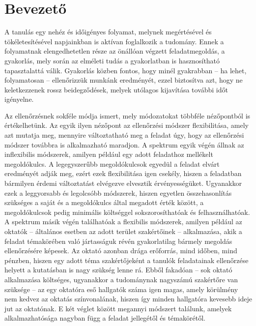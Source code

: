 \chapter*{Bevezető}

A tanulás egy nehéz és időigényes folyamat, melynek megértésével és tökéletesítésével napjainkban is aktívan foglalkozik a tudomány.
Ennek a folyamatnak elengedhetetlen része az önállóan végzett feladatmegoldás, a gyakorlás, mely során az elméleti tudás a gyakorlatban is hasznosítható tapasztalattá válik.
Gyakorlás közben fontos, hogy minél gyakrabban -- ha lehet, folyamatosan -- ellenőrizzük munkánk eredményét, ezzel biztosítva azt, hogy ne keletkezzenek rossz beidegződések, melyek utólagos kijavítása további időt igényelne.

Az ellenőrzésnek sokféle módja ismert, mely módozatokat többféle nézőpontból is értékelhetünk.
Az egyik ilyen nézőpont az ellenőrzési módszer flexibilitása, amely azt mutatja meg, mennyire változtatható meg a feladat úgy, hogy az ellenőrzési módszer továbbra is alkalmazható maradjon.
A spektrum egyik végén állnak az inflexibilis módszerek, amilyen például egy adott feladathoz mellékelt megoldókulcs.
A legegyszerűbb megoldókulcsok egyedül a feladat elvárt eredményét adják meg, ezért ezek flexibilitása igen csekély, hiszen a feladatban bármilyen érdemi változtatást elvégezve elvesztik érvényességüket.
Ugyanakkor ezek a leggyorsabb és legolcsóbb módszerek, hiszen egyetlen összehasonlítás szükséges a saját és a megoldókulcs által megadott érték között, a megoldókulcsok pedig minimális költséggel sokszorosíthatóak és felhasználhatóak.
A spektrum másik végén találhatóak a flexibilis módszerek, amilyen például az oktatók -- általános esetben az adott terület szakértőinek -- alkalmazása, akik a feladat témakörében való jártasságuk révén gyakorlatilag bármely megoldás ellenőrzésére képesek.
Az oktató azonban drága erőforrás, mind időben, mind pénzben, hiszen egy adott téma szakértőjeként a tanulók feladatainak ellenőrzése helyett a kutatásban is nagy szükség lenne rá.
Ebből fakadóan -- sok oktató alkalmazása költséges, ugyanakkor a tudománynak nagyszámú szakértőre van szüksége -- az egy oktatóra eső hallgatók száma igen magas, amely körülmény nem kedvez az oktatás színvonalának, hiszen így minden hallgatóra kevesebb ideje jut az oktatónak.
E két véglet között megannyi módszert találunk, amelyek alkalmazhatósága nagyban függ a feladat jellegétől és témakörétől.

